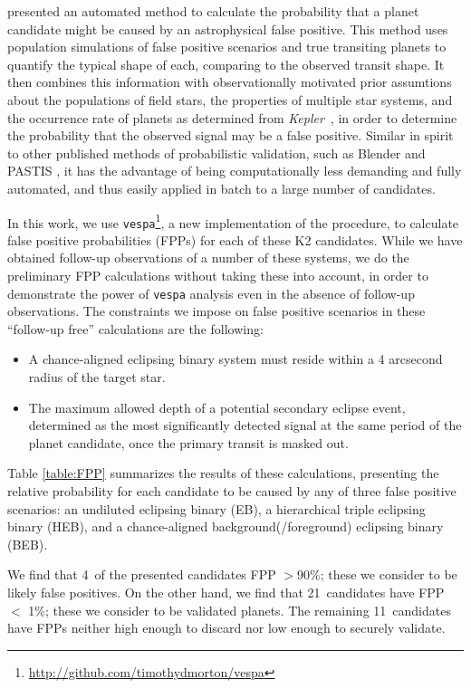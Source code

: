 \documentclass{emulateapj}
\newcommand{\project}[1]{\textsl{#1}}
\newcommand{\kep}{\project{Kepler}}
\newcommand{\Nfp}{4}
\newcommand{\Nvalidated}{21}
\newcommand{\Nlimbo}{11}
\begin{document}
\citet{Morton12} presented an automated method to calculate the
probability that a planet candidate might be caused by an
astrophysical false positive.
This method uses population simulations
of false positive scenarios and true transiting planets to quantify
the typical shape of each, comparing to the observed transit shape.
It then combines this information with observationally motivated prior
assumtions about the populations of field stars, the properties of
multiple star systems, and the occurrence rate of planets as determined
from \kep\ \citet{Fressin13}, in order to determine the probability that
the observed signal may be a false positive.
Similar in spirit to other published methods of
probabilistic validation, such as Blender \citep{} and PASTIS
\citep{}, it has the advantage of being computationally less demanding
and fully automated, and thus easily applied in batch to a large
number of candidates.

In this work, we use
\texttt{vespa}\footnote{\url{http://github.com/timothydmorton/vespa}},
a new implementation of the \citet{Morton12} procedure, to calculate
false positive probabilities (FPPs) for each of these K2 candidates.
While we have obtained follow-up observations of a number of these systems,
we do the preliminary FPP calculations without taking these into account,
in order to demonstrate the power of \texttt{vespa} analysis
even in the absence of follow-up observations.
The constraints we impose on false positive scenarios in these
``follow-up free'' calculations are the following:
\begin{itemize}
\item A chance-aligned eclipsing binary system must reside within
a 4 arcsecond radius of the target star.
\item The maximum allowed depth of a potential secondary eclipse event,
determined as the most significantly detected signal at the same
period of the planet candidate, once the primary transit is masked out.
\end{itemize}


Table \ref{table:FPP} summarizes the results of these
calculations, presenting the relative probability for each candidate
to be caused by any of three false positive scenarios: an undiluted
eclipsing binary (EB), a hierarchical triple eclipsing binary (HEB),
and a chance-aligned background(/foreground) eclipsing binary (BEB).


We find that \Nfp\ of the presented candidates FPP $>$90\%;
these we consider to be likely false positives.
On the other hand, we find that \Nvalidated\ candidates
have FPP $<$ 1\%; these we consider to be validated planets.
The remaining \Nlimbo\ candidates have FPPs neither high enough to discard
nor low enough to securely validate.
\end{document}
